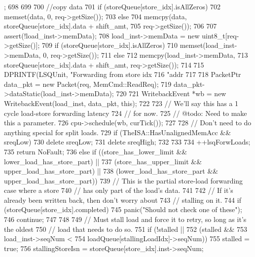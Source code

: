 \begin{DoxyCode}
{{{      ;
698 
699 
700             //copy data
701             if (storeQueue[store_idx].isAllZeros)
702                 memset(data, 0, req->getSize());
703             else
704                 memcpy(data, storeQueue[store_idx].data + shift_amt,
705                    req->getSize());
706 
707             assert(!load_inst->memData);
708             load_inst->memData = new uint8_t[req->getSize()];
709             if (storeQueue[store_idx].isAllZeros)
710                 memset(load_inst->memData, 0, req->getSize());
711             else
712                 memcpy(load_inst->memData,
713                     storeQueue[store_idx].data + shift_amt, req->getSize());
714 
715             DPRINTF(LSQUnit, "Forwarding from store idx %
716                     "addr %
717 
718             PacketPtr data_pkt = new Packet(req, MemCmd::ReadReq);
719             data_pkt->dataStatic(load_inst->memData);
720 
721             WritebackEvent *wb = new WritebackEvent(load_inst, data_pkt, this);
722 
723             // We'll say this has a 1 cycle load-store forwarding latency
724             // for now.
725             // @todo: Need to make this a parameter.
726             cpu->schedule(wb, curTick());
727 
728             // Don't need to do anything special for split loads.
729             if (TheISA::HasUnalignedMemAcc && sreqLow) {
730                 delete sreqLow;
731                 delete sreqHigh;
732             }
733 
734             ++lsqForwLoads;
735             return NoFault;
736         } else if ((store_has_lower_limit && lower_load_has_store_part) ||
737                    (store_has_upper_limit && upper_load_has_store_part) ||
738                    (lower_load_has_store_part && upper_load_has_store_part)) {
739             // This is the partial store-load forwarding case where a store
740             // has only part of the load's data.
741 
742             // If it's already been written back, then don't worry about
743             // stalling on it.
744             if (storeQueue[store_idx].completed) {
745                 panic("Should not check one of these");
746                 continue;
747             }
748 
749             // Must stall load and force it to retry, so long as it's the oldest
750             // load that needs to do so.
751             if (!stalled ||
752                 (stalled &&
753                  load_inst->seqNum <
754                  loadQueue[stallingLoadIdx]->seqNum)) {
755                 stalled = true;
756                 stallingStoreIsn = storeQueue[store_idx].inst->seqNum;
}}}}
\end{DoxyCode}
